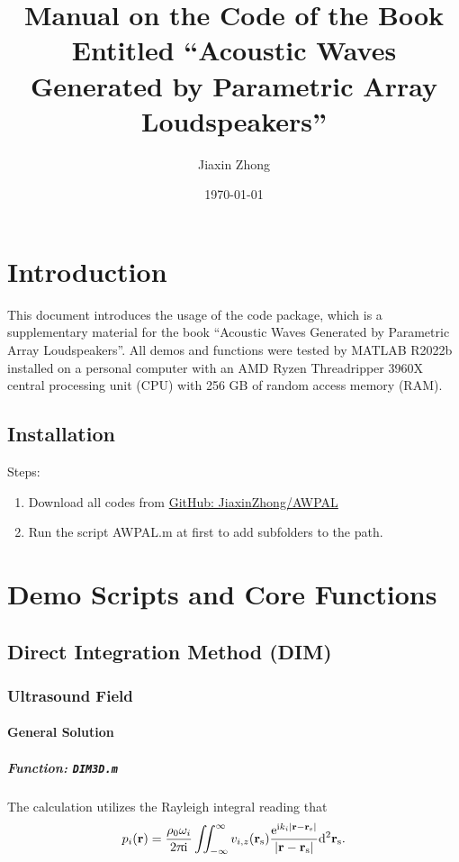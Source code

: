 \documentclass[12pt]{article}
\title{Manual on the Code of the Book Entitled ``Acoustic Waves Generated by Parametric Array Loudspeakers''}
\author{Jiaxin Zhong}
\date{\today}
\begin{document}
\maketitle

\tableofcontents


\section{Introduction}
This document introduces the usage of the code package, which is a supplementary material for the book ``Acoustic Waves Generated by Parametric Array Loudspeakers''.
All demos and functions were tested by MATLAB R2022b installed on a personal computer with an AMD Ryzen Threadripper 3960X central processing unit (CPU) with 256 GB of random access memory (RAM).

\subsection{Installation}

Steps:
\begin{enumerate}
    \item Download all codes from \href{https://github.com/JiaxinZhong/AWPAL/}{GitHub: JiaxinZhong/AWPAL}
    \item Run the script AWPAL.m at first to add subfolders to the path.
\end{enumerate}





\section{Demo Scripts and Core Functions}

\subsection{Direct Integration Method (DIM)}

\subsubsection{Ultrasound Field}
\paragraph{General Solution}

\subparagraph{Function: \lstinline!DIM3D.m!}
The calculation utilizes the Rayleigh integral reading that \cite[Eq. (2.39)]{Zhong2024AcousticWavesGenerated}
\begin{equation}
    p_i(\vb{r})
    =
    \frac{\rho_0\omega_i}{2\uppi \mathrm{i} }
    \iint_{-\infty}^\infty
    v_{i,z}(\vb{r}_\mathrm{s})
    \frac{\mathrm{e}^{\mathrm{i} k_i \abs{\vb{r}-\vb{r}_\mathrm{s}}}}{\abs{\vb{r}-\vb{r}_\mathrm{s}}}
    \dd^2 \vb{r}_\mathrm{s}
    .
    \label{eq:Rayleigh_int:3ije23oi}
\end{equation}
\end{document}
